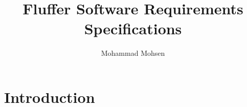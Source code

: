 \documentclass[12pt,a4paper,draft]{article}
\author{Mohammad Mohsen}
\title{Fluffer Software Requirements Specifications}
\begin{document}
\maketitle
\section{Introduction}
\end{document}
